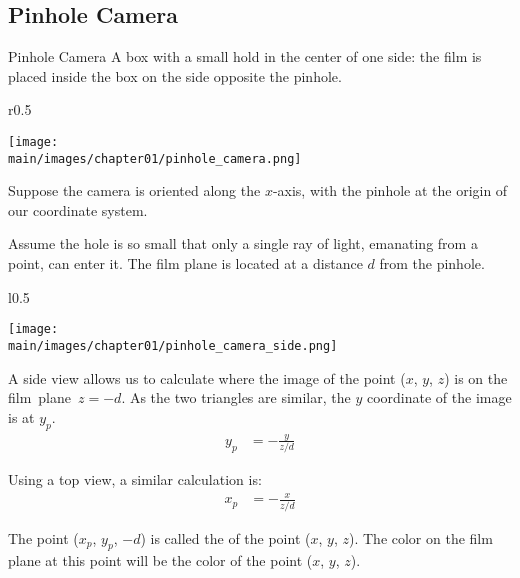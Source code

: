\documentclass[\main/notes.tex]{subfiles}
\begin{document}
			\subsection{Pinhole Camera}
				\begin{definition}{Pinhole Camera}
					A box with a small hold in the center of one side:
					the film is placed inside the box on the side opposite the pinhole.
				\end{definition}
				\begin{example}
					\begin{wrapfigure}[7]{r}{0.5\textwidth}
						\begin{center}
							\texttt{[image: \\main/images/chapter01/pinhole\_camera.png]}
						\end{center}
						\caption{Pinhole Camera}
					\end{wrapfigure}

					Suppose the camera is oriented along the \mbox{$x$-axis},
					with the pinhole at the origin of our coordinate system.

					Assume the hole is so small that only a single ray of light,
					emanating from a point, can enter it.
					The film plane is located at a distance $d$ from the pinhole.

					\vspace{4.5em}
					\pagebreak

					\begin{wrapfigure}[11]{l}{0.5\textwidth}
						\vspace{-20pt}
						\begin{center}
							\texttt{[image: \\main/images/chapter01/pinhole\_camera\_side.png]}
						\end{center}
						\vspace{-10pt}
						\caption{Pinhole Camera Side View}
					\end{wrapfigure}

					A side view allows us to calculate where the image of the point ($x$, $y$, $z$) is
					on the film~plane~$z = -d$.
					As the two triangles are similar, the $y$ coordinate of the image is at $y_p$.
					\begin{align*}
						y_p &= -\frac{y}{z/d}
					\end{align*}

					Using a top view, a similar calculation is:
					\begin{align*}
						x_p &= -\frac{x}{z/d}
					\end{align*}

					The point ($x_p$, $y_p$, $-d$) is called the 
					of the point ($x$, $y$, $z$).
					The color on the film plane at this point will be the color of the point ($x$, $y$, $z$).
				\end{example}
\end{document}
